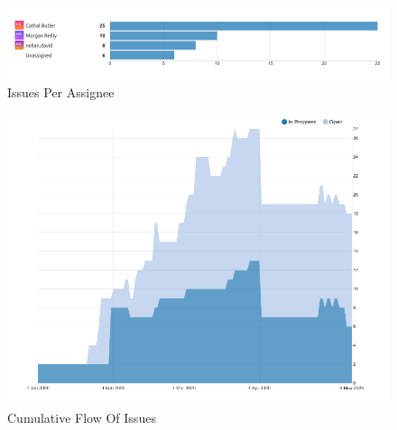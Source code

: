 \begin{figure}[h!]
    \caption{Issues Per Assignee}
    \label{image:IPA}
    \centering
    \includegraphics[width=1.0\textwidth]{images/IssuesPerAssignee.png}
\end{figure}

\begin{figure}[h!]
    \caption{Cumulative Flow Of Issues}
    \label{image:cumFlow}
    \centering
    \includegraphics[width=1.0\textwidth]{images/FlowCumulative.png}
\end{figure}